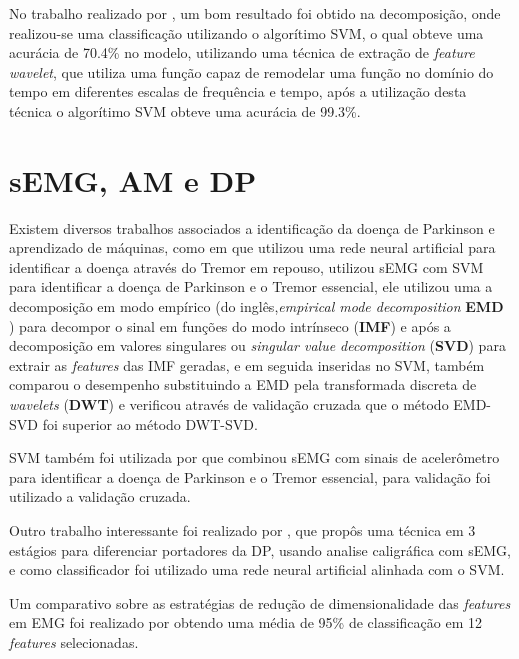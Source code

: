 No trabalho realizado por , um bom resultado foi obtido na decomposição, onde realizou-se uma classificação utilizando o algorítimo SVM, o qual obteve uma acurácia de 70.4\% no modelo, utilizando uma técnica de extração de \textit{feature} \textit{wavelet}, que utiliza uma função capaz de remodelar uma função no domínio do tempo em diferentes escalas de frequência e tempo, após a utilização desta técnica o algorítimo SVM obteve uma acurácia de 99.3\%.

\section{sEMG, AM e DP}
Existem diversos trabalhos associados a identificação da doença de Parkinson e aprendizado de máquinas, como em \cite{camara2015resting} que utilizou uma rede neural artificial para identificar a doença através do Tremor em repouso,  utilizou sEMG com SVM para identificar a doença de Parkinson e o Tremor essencial, ele utilizou uma a decomposição em modo empírico (do inglês,\textit{empirical mode decomposition} \textbf{EMD} ) para decompor o sinal em funções do modo intrínseco (\textbf{IMF}) e após a decomposição em valores singulares ou \textit{singular value decomposition} (\textbf{SVD}) para extrair as \textit{features} das IMF geradas, e em seguida inseridas no SVM,  também comparou o desempenho substituindo a EMD pela transformada discreta de \textit{wavelets} (\textbf{DWT})  e verificou através de validação cruzada que o método EMD-SVD foi superior ao método DWT-SVD.

SVM também foi utilizada por \cite{kugler2013automated} que combinou sEMG com sinais de acelerômetro para identificar a doença de Parkinson e o Tremor essencial, para validação foi utilizado a validação cruzada.

Outro trabalho interessante foi realizado por \cite{loconsole2018model}, que propôs uma técnica em 3 estágios para diferenciar portadores da DP, usando analise caligráfica com sEMG, e como classificador foi utilizado uma rede neural artificial alinhada com o SVM.

Um comparativo sobre as estratégias de redução de dimensionalidade das \textit{features} em EMG foi realizado por \cite{liu2014feature} obtendo uma média de 95\% de classificação em 12 \textit{features} selecionadas. 
